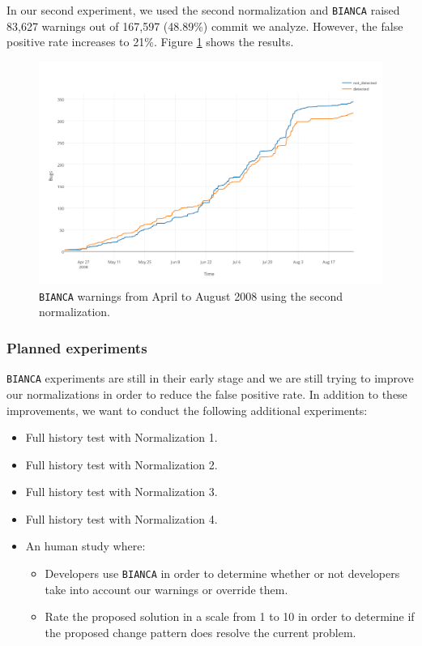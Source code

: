 In our second experiment, we used the second normalization and {\tt BIANCA} raised 83,627 warnings out of 167,597 (48.89\%) commit we analyze. However, the false positive rate increases to 21\%. Figure \ref{fig:bianca-exp-2} shows the results.

\begin{figure}[h!]
  \centering
    \includegraphics[scale=0.55]{media/bianca-20.png}
    \caption{{\tt BIANCA} warnings from April to August 2008 using the second normalization.
    \label{fig:bianca-exp-2}}
\end{figure}

\subsubsection{Planned experiments}

{\tt BIANCA} experiments are still in their early stage and we are still trying to improve our normalizations in order to reduce the false positive rate. In addition to these improvements, we want to conduct the following additional experiments:

\begin{itemize}
	\item Full history test with Normalization 1.
	\item Full history test with Normalization 2.
	\item Full history test with Normalization 3.
	\item Full history test with Normalization 4.
	\item An human study where:
	\begin{itemize}
		\item  Developers use {\tt BIANCA} in order to determine whether or not developers take into account our warnings or override them.
		\item Rate the proposed solution in a scale from 1 to 10 in order to determine if the proposed change pattern does resolve the current problem.
	\end{itemize}
\end{itemize}
